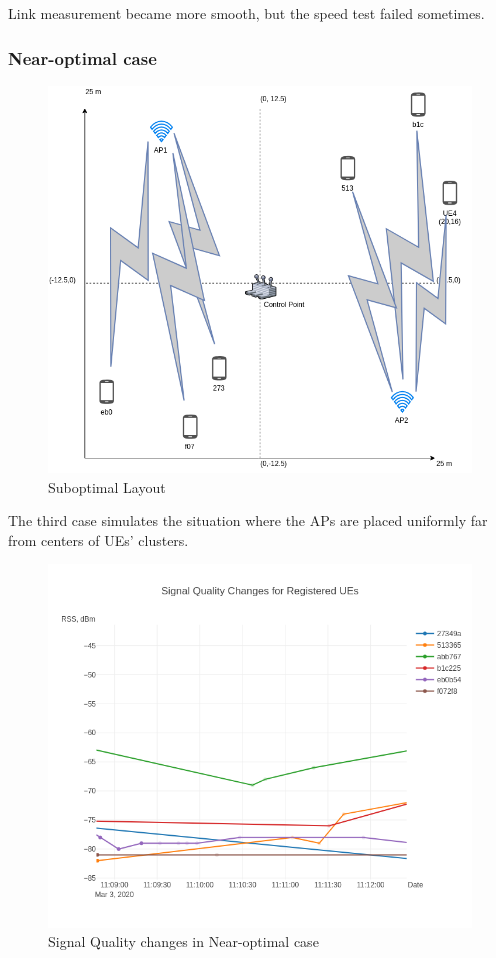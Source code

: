 Link measurement became more smooth, but the speed test failed
sometimes.

\hypertarget{near-optimal-case}{%
\subsubsection{Near-optimal case}\label{near-optimal-case}}

\begin{figure}[H]
	\centering
	\includegraphics[width=\linewidth,keepaspectratio]{images/05-cases-description-Exp4-Near-Optimal.png}
\caption{Suboptimal Layout}
\end{figure}

The third case simulates the situation where the APs are placed
uniformly far from centers of UEs' clusters.

\begin{figure}[H]
	\centering
	\includegraphics[width=\linewidth,keepaspectratio]{images/Exp4_Near_Optimal.png}
\caption{Signal Quality changes in Near-optimal case}
\end{figure}

